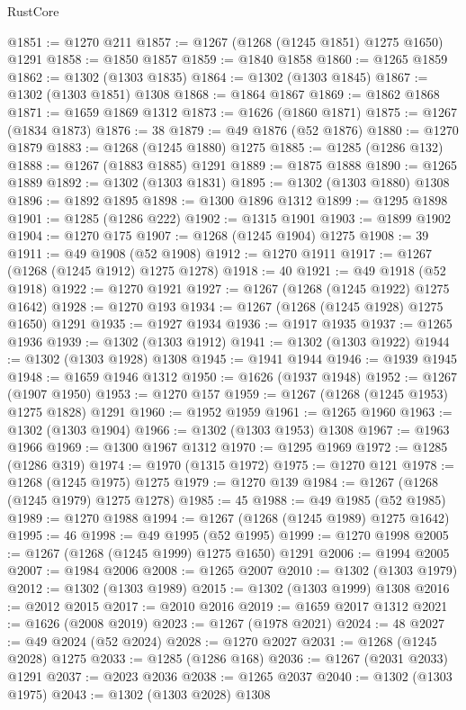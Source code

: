 \begin{lexlean}{RustCore}
\begin{coremodule}
@1851 := @1270 @211
@1857 := @1267 (@1268 (@1245 @1851) @1275 @1650) @1291
@1858 := @1850 @1857
@1859 := @1840 @1858
@1860 := @1265 @1859
@1862 := @1302 (@1303 @1835)
@1864 := @1302 (@1303 @1845)
@1867 := @1302 (@1303 @1851) @1308
@1868 := @1864 @1867
@1869 := @1862 @1868
@1871 := @1659 @1869 @1312
@1873 := @1626 (@1860 @1871)
@1875 := @1267 (@1834 @1873)
@1876 := 38
@1879 := @49 @1876 (@52 @1876)
@1880 := @1270 @1879
@1883 := @1268 (@1245 @1880) @1275
@1885 := @1285 (@1286 @132)
@1888 := @1267 (@1883 @1885) @1291
@1889 := @1875 @1888
@1890 := @1265 @1889
@1892 := @1302 (@1303 @1831)
@1895 := @1302 (@1303 @1880) @1308
@1896 := @1892 @1895
@1898 := @1300 @1896 @1312
@1899 := @1295 @1898
@1901 := @1285 (@1286 @222)
@1902 := @1315 @1901
@1903 := @1899 @1902
@1904 := @1270 @175
@1907 := @1268 (@1245 @1904) @1275
@1908 := 39
@1911 := @49 @1908 (@52 @1908)
@1912 := @1270 @1911
@1917 := @1267 (@1268 (@1245 @1912) @1275 @1278)
@1918 := 40
@1921 := @49 @1918 (@52 @1918)
@1922 := @1270 @1921
@1927 := @1267 (@1268 (@1245 @1922) @1275 @1642)
@1928 := @1270 @193
@1934 := @1267 (@1268 (@1245 @1928) @1275 @1650) @1291
@1935 := @1927 @1934
@1936 := @1917 @1935
@1937 := @1265 @1936
@1939 := @1302 (@1303 @1912)
@1941 := @1302 (@1303 @1922)
@1944 := @1302 (@1303 @1928) @1308
@1945 := @1941 @1944
@1946 := @1939 @1945
@1948 := @1659 @1946 @1312
@1950 := @1626 (@1937 @1948)
@1952 := @1267 (@1907 @1950)
@1953 := @1270 @157
@1959 := @1267 (@1268 (@1245 @1953) @1275 @1828) @1291
@1960 := @1952 @1959
@1961 := @1265 @1960
@1963 := @1302 (@1303 @1904)
@1966 := @1302 (@1303 @1953) @1308
@1967 := @1963 @1966
@1969 := @1300 @1967 @1312
@1970 := @1295 @1969
@1972 := @1285 (@1286 @319)
@1974 := @1970 (@1315 @1972)
@1975 := @1270 @121
@1978 := @1268 (@1245 @1975) @1275
@1979 := @1270 @139
@1984 := @1267 (@1268 (@1245 @1979) @1275 @1278)
@1985 := 45
@1988 := @49 @1985 (@52 @1985)
@1989 := @1270 @1988
@1994 := @1267 (@1268 (@1245 @1989) @1275 @1642)
@1995 := 46
@1998 := @49 @1995 (@52 @1995)
@1999 := @1270 @1998
@2005 := @1267 (@1268 (@1245 @1999) @1275 @1650) @1291
@2006 := @1994 @2005
@2007 := @1984 @2006
@2008 := @1265 @2007
@2010 := @1302 (@1303 @1979)
@2012 := @1302 (@1303 @1989)
@2015 := @1302 (@1303 @1999) @1308
@2016 := @2012 @2015
@2017 := @2010 @2016
@2019 := @1659 @2017 @1312
@2021 := @1626 (@2008 @2019)
@2023 := @1267 (@1978 @2021)
@2024 := 48
@2027 := @49 @2024 (@52 @2024)
@2028 := @1270 @2027
@2031 := @1268 (@1245 @2028) @1275
@2033 := @1285 (@1286 @168)
@2036 := @1267 (@2031 @2033) @1291
@2037 := @2023 @2036
@2038 := @1265 @2037
@2040 := @1302 (@1303 @1975)
@2043 := @1302 (@1303 @2028) @1308

\end{coremodule}
\end{lexlean}

